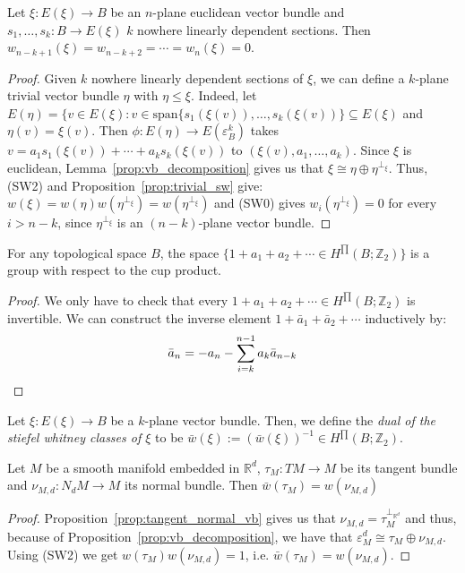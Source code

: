 \begin{proposition} Let $\xi:E(\xi)\to B$ be an $n$-plane euclidean vector bundle and $s_1,\ldots,s_k:B\to E(\xi)$ $k$ nowhere linearly dependent sections. Then $w_{n-k+1}(\xi)=w_{n-k+2}=\cdots=w_n(\xi)=0$.
\end{proposition}
\begin{proof} Given $k$ nowhere linearly dependent sections of $\xi$, we can define a $k$-plane trivial vector bundle $\eta$ with $\eta\leq\xi$. Indeed, let $E(\eta)=\big\{v\in E(\xi):v\in\mathrm{span}\{s_1(\xi(v)),\ldots,s_k(\xi(v))\}\subseteq E(\xi)$ and $\eta(v)=\xi(v)$. Then $\phi:E(\eta)\to E(\varepsilon_B^k)$ takes $v=a_1s_1(\xi(v))+\cdots+a_ks_k(\xi(v))$ to $(\xi(v),a_1,\ldots,a_k)$. Since $\xi$ is euclidean, Lemma~\ref{prop:vb_decomposition} gives us that $\xi\cong\eta\oplus\eta^{\perp_{\xi}}$. Thus, (SW2) and Proposition~\ref{prop:trivial_sw} give: $w(\xi)=w(\eta)w(\eta^{\perp_{\xi}})=w(\eta^{\perp_{\xi}})$ and (SW0) gives $w_i(\eta^{\perp_{\xi}})=0$ for every $i>n-k$, since $\eta^{\perp_{\xi}}$ is an $(n-k)$-plane vector bundle.
\end{proof}

\begin{lemma} For any topological space $B$, the space $\big\{1+a_1+a_2+\cdots\in H^{\prod}(B;\mathbb{Z}_2)\big\}$ is a group with respect to the cup product.
\end{lemma}
\begin{proof} We only have to check that every $1+a_1+a_2+\cdots\in H^{\prod}(B;\mathbb{Z}_2)$ is invertible. We can construct the inverse element $1+\bar{a}_1+\bar{a}_2+\cdots$ inductively by:
\[\bar{a}_n=-a_n-\sum_{i=k}^{n-1}a_k\bar{a}_{n-k}\qedhere\]
\end{proof}

\begin{definition} Let $\xi:E(\xi)\to B$ be a $k$-plane vector bundle. Then, we define the \emph{dual of the stiefel whitney classes of $\xi$} to be $\bar{w}(\xi):=(\bar{w}(\xi))^{-1}\in H^{\prod}(B;\mathbb{Z}_2)$.
\end{definition}

\begin{proposition} Let $M$ be a smooth manifold embedded in $\mathbb{R}^d$, $\tau_M:TM\to M$ be its tangent bundle and $\nu_{M,d}:N_dM\to M$ its normal bundle. Then $\bar{w}(\tau_M)=w(\nu_{M,d})$
\end{proposition}
\begin{proof} Proposition~\ref{prop:tangent_normal_vb} gives us that $\nu_{M,d}=\tau_M^{\perp_{\mathbb{R}^d}}$ and thus, because of Proposition~\ref{prop:vb_decomposition}, we have that $\varepsilon_M^d\cong\tau_M\oplus\nu_{M,d}$. Using (SW2) we get $w(\tau_M)w(\nu_{M,d})=1$, i.e. $\bar{w}(\tau_M)=w(\nu_{M,d})$.
\end{proof}

